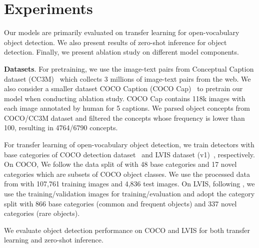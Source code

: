 \section{Experiments}
\label{sec:experiments}

Our models are primarily evaluated on transfer learning for open-vocabulary object detection. We also present results of zero-shot inference for object detection. Finally, we present ablation study on different model components.


\smallskip
\noindent \textbf{Datasets}. For pretraining, we use the image-text pairs from Conceptual Caption dataset (CC3M)~\cite{sharma2018conceptual} which collects 3 millions of image-text pairs from the web. We also consider a smaller dataset COCO Caption (COCO Cap)~\cite{chen2015microsoft} to pretrain our model when conducting ablation study. COCO Cap contains 118k images with each image annotated by human for 5 captions. We parsed object concepts from COCO/CC3M dataset and filtered the concepts whose frequency is lower than 100, resulting in 4764/6790 concepts. 

For transfer learning of open-vocabulary object detection, we train detectors with base categories of COCO detection dataset~\cite{lin2014microsoft} and LVIS dataset (v1)~\cite{gupta2019lvis}, respectively. On COCO, We follow the data split of \cite{bansal2018zero} with 48 base categories and 17 novel categories which are subsets of COCO object classes. We use the processed data from \cite{zareian2021open} with 107,761 training images and 4,836 test images. On LVIS, following \cite{gu2021zero}, we use the training/validation images for training/evaluation and adopt the category split with 866 base categories (common and frequent objects) and 337 novel categories (rare objects). 

We evaluate object detection performance on COCO and LVIS for both transfer learning and zero-shot inference.



